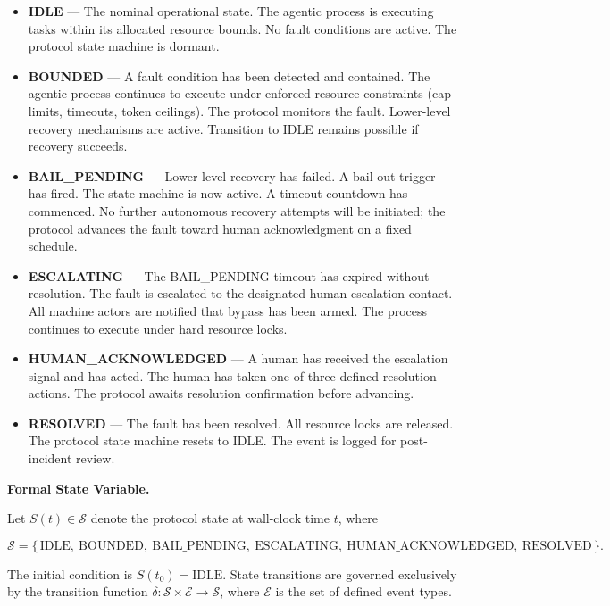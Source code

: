 \begin{itemize}
  \item \textbf{IDLE} — The nominal operational state. The agentic process is executing tasks within its allocated resource bounds. No fault conditions are active. The protocol state machine is dormant.
  \item \textbf{BOUNDED} — A fault condition has been detected and contained. The agentic process continues to execute under enforced resource constraints (cap limits, timeouts, token ceilings). The protocol monitors the fault. Lower-level recovery mechanisms are active. Transition to IDLE remains possible if recovery succeeds.
  \item \textbf{BAIL\_PENDING} — Lower-level recovery has failed. A bail-out trigger has fired. The state machine is now active. A timeout countdown has commenced. No further autonomous recovery attempts will be initiated; the protocol advances the fault toward human acknowledgment on a fixed schedule.
  \item \textbf{ESCALATING} — The BAIL\_PENDING timeout has expired without resolution. The fault is escalated to the designated human escalation contact. All machine actors are notified that bypass has been armed. The process continues to execute under hard resource locks.
  \item \textbf{HUMAN\_ACKNOWLEDGED} — A human has received the escalation signal and has acted. The human has taken one of three defined resolution actions. The protocol awaits resolution confirmation before advancing.
  \item \textbf{RESOLVED} — The fault has been resolved. All resource locks are released. The protocol state machine resets to IDLE. The event is logged for post-incident review.
\end{itemize}

\bigskip

\noindent\textbf{Formal State Variable.}

Let $S(t) \in \mathcal{S}$ denote the protocol state at wall-clock time $t$, where

\begin{equation}
  \mathcal{S} = \{\,\text{IDLE},\ \text{BOUNDED},\ \text{BAIL\_PENDING},\ \text{ESCALATING},\ \text{HUMAN\_ACKNOWLEDGED},\ \text{RESOLVED}\,\}.
\end{equation}

The initial condition is $S(t_0) = \text{IDLE}$. State transitions are governed exclusively by the transition function $\delta: \mathcal{S} \times \mathcal{E} \rightarrow \mathcal{S}$, where $\mathcal{E}$ is the set of defined event types.

